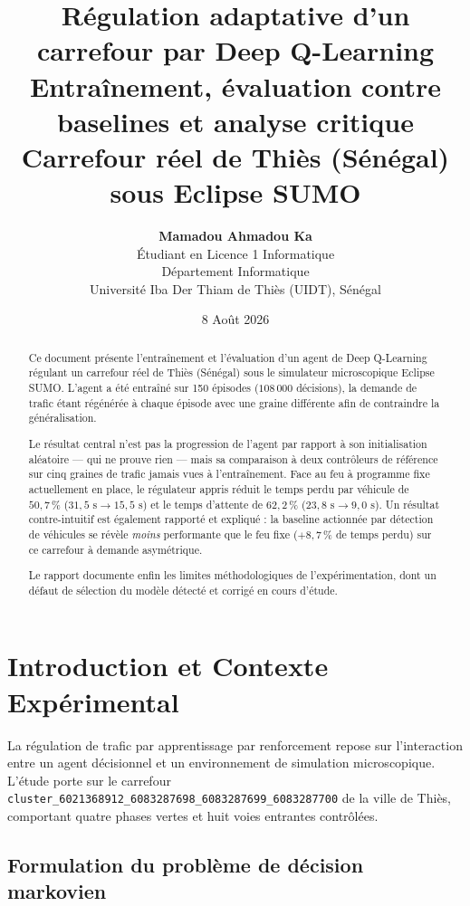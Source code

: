 \documentclass[11pt,a4paper]{article}
\title{\textbf{Régulation adaptative d'un carrefour par Deep Q-Learning} \\
\Large Entraînement, évaluation contre baselines et analyse critique \\
\normalsize Carrefour réel de Thiès (Sénégal) sous Eclipse SUMO}
\author{\textbf{Mamadou Ahmadou Ka} \\
Étudiant en Licence 1 Informatique \\
Département Informatique \\
Université Iba Der Thiam de Thiès (UIDT), Sénégal}
\date{8 Août 2026}
\begin{document}
\maketitle

\begin{abstract}
Ce document présente l'entraînement et l'évaluation d'un agent de Deep Q-Learning
régulant un carrefour réel de Thiès (Sénégal) sous le simulateur microscopique
Eclipse SUMO. L'agent a été entraîné sur 150 épisodes ($108\,000$ décisions), la
demande de trafic étant régénérée à chaque épisode avec une graine différente afin
de contraindre la généralisation.

Le résultat central n'est pas la progression de l'agent par rapport à son
initialisation aléatoire --- qui ne prouve rien --- mais sa comparaison à deux
contrôleurs de référence sur cinq graines de trafic jamais vues à l'entraînement.
Face au feu à programme fixe actuellement en place, le régulateur appris réduit le
temps perdu par véhicule de $50{,}7\,\%$ ($31{,}5\text{ s} \rightarrow 15{,}5\text{ s}$)
et le temps d'attente de $62{,}2\,\%$ ($23{,}8\text{ s} \rightarrow 9{,}0\text{ s}$).
Un résultat contre-intuitif est également rapporté et expliqué : la baseline
actionnée par détection de véhicules se révèle \emph{moins} performante que le feu
fixe ($+8{,}7\,\%$ de temps perdu) sur ce carrefour à demande asymétrique.

Le rapport documente enfin les limites méthodologiques de l'expérimentation, dont
un défaut de sélection du modèle détecté et corrigé en cours d'étude.
\end{abstract}

\newpage
\tableofcontents
\newpage

\section{Introduction et Contexte Expérimental}

La régulation de trafic par apprentissage par renforcement repose sur l'interaction
entre un agent décisionnel et un environnement de simulation microscopique. L'étude
porte sur le carrefour
\texttt{cluster\_6021368912\_6083287698\_6083287699\_6083287700} de la ville de
Thiès, comportant quatre phases vertes et huit voies entrantes contrôlées.

\subsection{Formulation du problème de décision markovien}
\end{document}
